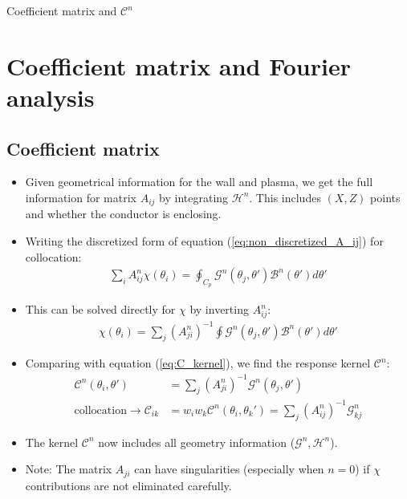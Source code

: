 \documentclass[8pt]{beamer}
\begin{document}
\begin{frame}{\color{white} Coefficient matrix and $\mathcal{C}^n$}
\section{Coefficient matrix and Fourier analysis}

\subsection{Coefficient matrix}
\begin{itemize}
    \item Given geometrical information for the wall and plasma, we get the full information for matrix $A_{ij}$ by integrating $\mathcal{H}^n$. This includes $(X,Z)$ points and whether the conductor is enclosing.
    \item Writing the discretized form of equation (\ref{eq:non_discretized_A_ij}) for collocation:
    \begin{align}
         \sum_i A^n_{ij}\chi(\theta_i) = \oint_{C_p} \mathcal{G}^n(\theta_j, \theta') \mathcal{B}^n (\theta') d\theta'
    \end{align}
    \item This can be solved directly for $\chi$ by inverting $A^n_{ij}$:
    \begin{align}
         \chi(\theta_i) =\sum_j (A^n_{ji})^{-1} \oint \mathcal{G}^n(\theta_j, \theta') \mathcal{B}^n (\theta') d\theta' 
    \end{align}
    \item Comparing with equation (\ref{eq:C_kernel}), we find the response kernel $\mathcal{C}^n$:
    \begin{align}
         \mathcal{C}^n(\theta_i,\theta') &= \sum_j (A^n_{ji})^{-1} \mathcal{G}^n(\theta_j,\theta') \\
         \text{collocation} \to \mathcal{C}_{ik} &= w_i w_k \mathcal{C}^n(\theta_i, \theta_k') = \sum_j (A^n_{ij})^{-1}\mathcal{G}^n_{kj}
         \label{eq:C_kernel_def}
    \end{align}
    \item The kernel $\mathcal{C}^n$ now includes all geometry information ($\mathcal{G}^n, \mathcal{H}^n$).
    \item Note: The matrix $A_{ji}$ can have singularities (especially when $n=0$) if $\chi$ contributions are not eliminated carefully.
\end{itemize}
\end{frame}
\end{document}
